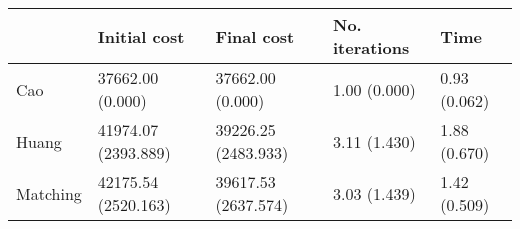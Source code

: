 \begin{tabular}{lllll}
\toprule
{} &         Initial cost &           Final cost & No. iterations &          Time \\
\midrule
Cao      &     37662.00 (0.000) &     37662.00 (0.000) &   1.00 (0.000) &  0.93 (0.062) \\
Huang    &  41974.07 (2393.889) &  39226.25 (2483.933) &   3.11 (1.430) &  1.88 (0.670) \\
Matching &  42175.54 (2520.163) &  39617.53 (2637.574) &   3.03 (1.439) &  1.42 (0.509) \\
\bottomrule
\end{tabular}
